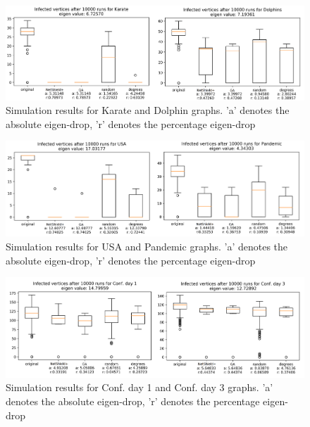 \documentclass[11pt]{article}
\theoremstyle{definition}
\begin{document}
\begin{figure}[h!]
  \centering
    \includegraphics[width=1\textwidth]{sim_res_e/Karate_Dolphin}
  \caption{Simulation results for Karate and Dolphin graphs. 'a' denotes the absolute eigen-drop, 'r' denotes the percentage eigen-drop}
  \label{fig:sim_karate_dolphin}
\end{figure}

\begin{figure}[h!]
  \centering
    \includegraphics[width=1\textwidth]{sim_res_e/usa_pandemic}
  \caption{Simulation results for USA and Pandemic graphs. 'a' denotes the absolute eigen-drop, 'r' denotes the percentage eigen-drop}
  \label{fig:sim_usa_pandemic}
\end{figure}

\begin{figure}[h!]
  \centering
    \includegraphics[width=1\textwidth]{sim_res_e/day1_day3}
  \caption{Simulation results for Conf. day 1 and Conf. day 3 graphs. 'a' denotes the absolute eigen-drop, 'r' denotes the percentage eigen-drop}
  \label{fig:sim_day1_day3}
\end{figure}
\end{document}
